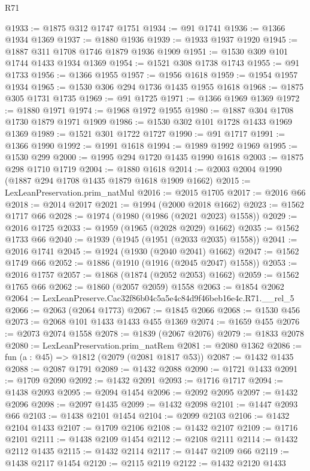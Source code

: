 \begin{lexlean}{R71}
\begin{coremodule}
@1933 := @1875 @312 @1747 @1751
@1934 := @91 @1741
@1936 := @1366 @1934 @1369
@1937 := @1880 @1936
@1939 := @1933 @1937 @1920
@1945 := @1887 @311 @1708 @1746 @1879 @1936 @1909
@1951 := @1530 @309 @101 @1744 @1433 @1934 @1369
@1954 := @1521 @308 @1738 @1743
@1955 := @91 @1733
@1956 := @1366 @1955
@1957 := @1956 @1618
@1959 := @1954 @1957 @1934
@1965 := @1530 @306 @294 @1736 @1435 @1955 @1618
@1968 := @1875 @305 @1731 @1735
@1969 := @91 @1725
@1971 := @1366 @1969 @1369
@1972 := @1880 @1971
@1974 := @1968 @1972 @1955
@1980 := @1887 @304 @1708 @1730 @1879 @1971 @1909
@1986 := @1530 @302 @101 @1728 @1433 @1969 @1369
@1989 := @1521 @301 @1722 @1727
@1990 := @91 @1717
@1991 := @1366 @1990
@1992 := @1991 @1618
@1994 := @1989 @1992 @1969
@1995 := @1530 @299
@2000 := @1995 @294 @1720 @1435 @1990 @1618
@2003 := @1875 @298 @1710 @1719
@2004 := @1880 @1618
@2014 := @2003 @2004 @1990 (@1887 @294 @1708 @1435 @1879 @1618 @1909 @1662)
@2015 := LexLeanPreservation.prim_natMul
@2016 := @2015 @1705
@2017 := @2016 @66
@2018 := @2014 @2017
@2021 := @1994 (@2000 @2018 @1662)
@2023 := @1562 @1717 @66
@2028 := @1974 (@1980 (@1986 (@2021 @2023) @1558))
@2029 := @2016 @1725
@2033 := @1959 (@1965 (@2028 @2029) @1662)
@2035 := @1562 @1733 @66
@2040 := @1939 (@1945 (@1951 (@2033 @2035) @1558))
@2041 := @2016 @1741
@2045 := @1924 (@1930 (@2040 @2041) @1662)
@2047 := @1562 @1749 @66
@2052 := @1886 (@1910 (@1916 (@2045 @2047) @1558))
@2053 := @2016 @1757
@2057 := @1868 (@1874 (@2052 @2053) @1662)
@2059 := @1562 @1765 @66
@2062 := @1860 (@2057 @2059) @1558
@2063 := @1854 @2062
@2064 := LexLeanPreserve.Cac32f86b04c5a5e4c84d9f46beb16e4c.R71.__rel_5
@2066 := @2063 (@2064 @1773)
@2067 := @1845 @2066
@2068 := @1530 @456
@2073 := @2068 @101 @1433 @1433 @455 @1369
@2074 := @1659 @455
@2076 := @2073 @2074 @1558
@2078 := @1839 (@2067 @2076)
@2079 := @1833 @2078
@2080 := LexLeanPreservation.prim_natRem
@2081 := @2080 @1362
@2086 := fun (a : @45) => @1812 (@2079 (@2081 @1817 @53))
@2087 := @1432 @1435
@2088 := @2087 @1791
@2089 := @1432 @2088
@2090 := @1721 @1433
@2091 := @1709 @2090
@2092 := @1432 @2091
@2093 := @1716 @1717
@2094 := @1438 @2093
@2095 := @2094 @1454
@2096 := @2092 @2095
@2097 := @1432 @2096
@2098 := @2097 @1435
@2099 := @1432 @2098
@2101 := @1447 @2093 @66
@2103 := @1438 @2101 @1454
@2104 := @2099 @2103
@2106 := @1432 @2104 @1433
@2107 := @1709 @2106
@2108 := @1432 @2107
@2109 := @1716 @2101
@2111 := @1438 @2109 @1454
@2112 := @2108 @2111
@2114 := @1432 @2112 @1435
@2115 := @1432 @2114
@2117 := @1447 @2109 @66
@2119 := @1438 @2117 @1454
@2120 := @2115 @2119
@2122 := @1432 @2120 @1433

\end{coremodule}
\end{lexlean}
